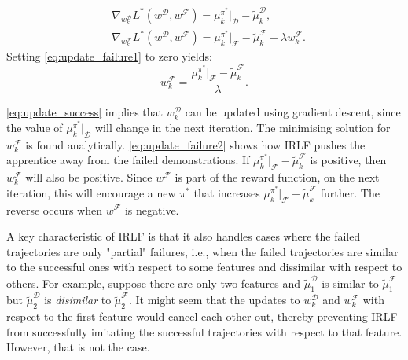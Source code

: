 \documentclass{aamas2016}
\newcommand{\sw}[1]{\textcolor{red}{SW: #1}}
\newcommand{\ks}[1]{\textcolor{dark_green}{Kyriacos: #1}}
\newcommand{\aama}[1]{\textcolor{dim_gray}{AAMAS: #1}}
\newcommand{\sw}[1]{}
\newcommand{\ks}[1]{}
\begin{document}
\begin{align}
	&\nabla_{w^{\mathcal{D}}_k}L^*(w^{\mathcal{D}},w^{\mathcal{F}}) = \mu^{\pi^*}_ k|_{\mathcal{D}}- \widetilde{\mu}^{\mathcal{D}}_k \label{eq:update_success},\\
		&\nabla_{w^{\mathcal{F}}_k}L^*(w^{\mathcal{D}},w^{\mathcal{F}}) = \mu^{\pi^*}_k|_{\mathcal{F}} - \widetilde{\mu}^{\mathcal{F}}_k - \lambda w^{\mathcal{F}}_k. \label{eq:update_failure1}
\end{align}
Setting \eqref{eq:update_failure1} to zero yields:
\begin{equation}
  \label{eq:update_failure2}
  w^{\mathcal{F}}_k = \frac{\mu^{\pi^*}_k|_{\mathcal{F}} - \widetilde{\mu}^{\mathcal{F}}_k}{\lambda}.
\end{equation}
%

\noindent \eqref{eq:update_success} implies that $w^{\mathcal{D}}_k$ can be updated using gradient descent, since the value of $\mu^{\pi^*}_ k|_{\mathcal{D}}$ will change in the next iteration.
The minimising solution for $w^{\mathcal{F}}_k$ is found analytically.
\eqref{eq:update_failure2} shows how IRLF pushes the apprentice away from the failed demonstrations.  If $\mu^{\pi^*}_k|_{\mathcal{F}} - \widetilde{\mu}^{\mathcal{F}}_k$ is positive, then $w^{\mathcal{F}}_k$ will also be positive.  Since $w^{\mathcal{F}}$ is part of the reward function, on the next iteration, this will encourage a new $\pi^*$ that increases $\mu^{\pi^*}_k|_{\mathcal{F}} - \widetilde{\mu}^{\mathcal{F}}_k$ further.  The reverse occurs when $w^{\mathcal{F}}$ is negative.

A key characteristic of IRLF is that it also handles cases where the failed trajectories are only "partial" failures, i.e., when the failed trajectories are similar to the successful ones with respect to some features and dissimilar with respect to others.
%
%
For example, suppose there are only two features and $\widetilde{\mu}^{\mathcal{D}}_1$ is similar to $\widetilde{\mu}^{\mathcal{F}}_1$ but $\widetilde{\mu}^{\mathcal{D}}_2$ is \emph{disimilar} to $\widetilde{\mu}^{\mathcal{F}}_2$. %
It might seem that the updates to $w^{\mathcal{D}}_k$ and $w^{\mathcal{F}}_k$ with respect to the first feature would cancel each other out, thereby preventing IRLF from successfully imitating the successful trajectories with respect to that feature.  However, that is not the case. 
\end{document}
